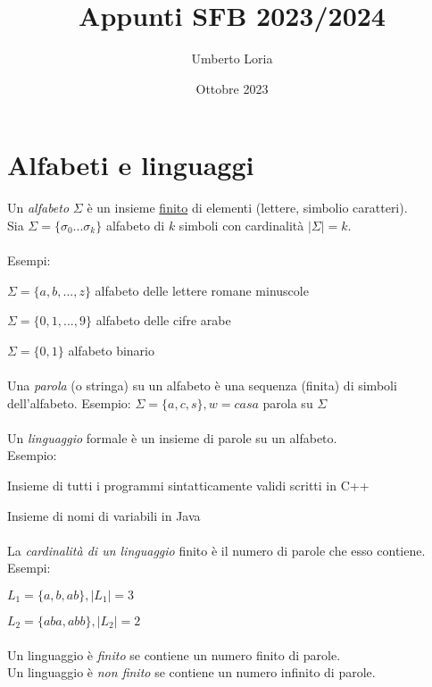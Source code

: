 \documentclass[]{article}
\title{Appunti SFB 2023/2024}
\author{Umberto Loria}
\date{Ottobre 2023}
\begin{document}
\begin{titlepage}
\maketitle
\end{titlepage}

\tableofcontents{}
\newpage

\section{Alfabeti e linguaggi}

Un \textit{alfabeto} \mbox{$\Sigma$} è un insieme \underline{finito} di elementi (lettere, simbolio caratteri).
\\
Sia \mbox{$\Sigma=\{\sigma_0 ... \sigma_k\}$} alfabeto di \begin{math}k\end{math} simboli con cardinalità \mbox{$|\Sigma|=k$}.
\\
\\
Esempi:

\mbox{$\Sigma=\{a, b, ..., z\}$} alfabeto delle lettere romane minuscole

\mbox{$\Sigma=\{0, 1, ..., 9\}$} alfabeto delle cifre arabe

\mbox{$\Sigma=\{0, 1\}$} alfabeto binario
\\
\\
Una \textit{parola} (o stringa) su un alfabeto è una sequenza (finita) di simboli dell'alfabeto.
Esempio: \mbox{$\Sigma = \{a, c, s\}, w = casa$} parola su \mbox{$\Sigma$}
\\
\\
Un \textit{linguaggio} formale è un insieme di parole su un alfabeto.
\\
Esempio:

Insieme di tutti i programmi sintatticamente validi scritti in C++

Insieme di nomi di variabili in Java
\\
\\
La \textit{cardinalità di un linguaggio} finito è il numero di parole che esso contiene.
Esempi:

\mbox{$L_1=\{a, b, ab\}, |L_1|=3$}

\mbox{$L_2=\{aba, abb\}, |L_2|=2$}
\\
\\
Un linguaggio è \textit{finito} se contiene un numero finito di parole.
\\
Un linguaggio è \textit{non finito} se contiene un numero infinito di parole.
\end{document}
